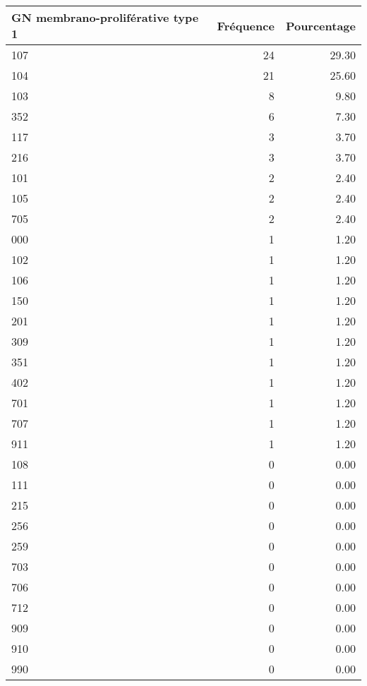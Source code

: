 \documentclass[11pt,a4paper]{article}\usepackage[]{graphicx}\usepackage[]{color}
\begin{document}
\begin{table}[H]
\centering
\begin{tabular}{lrr}
  \hline
GN membrano-proliférative type 1 & Fréquence & Pourcentage \\ 
  \hline
107 &  24 & 29.30 \\ 
  104 &  21 & 25.60 \\ 
  103 &   8 & 9.80 \\ 
  352 &   6 & 7.30 \\ 
  117 &   3 & 3.70 \\ 
  216 &   3 & 3.70 \\ 
  101 &   2 & 2.40 \\ 
  105 &   2 & 2.40 \\ 
  705 &   2 & 2.40 \\ 
  000 &   1 & 1.20 \\ 
  102 &   1 & 1.20 \\ 
  106 &   1 & 1.20 \\ 
  150 &   1 & 1.20 \\ 
  201 &   1 & 1.20 \\ 
  309 &   1 & 1.20 \\ 
  351 &   1 & 1.20 \\ 
  402 &   1 & 1.20 \\ 
  701 &   1 & 1.20 \\ 
  707 &   1 & 1.20 \\ 
  911 &   1 & 1.20 \\ 
  108 &   0 & 0.00 \\ 
  111 &   0 & 0.00 \\ 
  215 &   0 & 0.00 \\ 
  256 &   0 & 0.00 \\ 
  259 &   0 & 0.00 \\ 
  703 &   0 & 0.00 \\ 
  706 &   0 & 0.00 \\ 
  712 &   0 & 0.00 \\ 
  909 &   0 & 0.00 \\ 
  910 &   0 & 0.00 \\ 
  990 &   0 & 0.00 \\ 
   \hline
\end{tabular}
\end{table}
\end{document}
